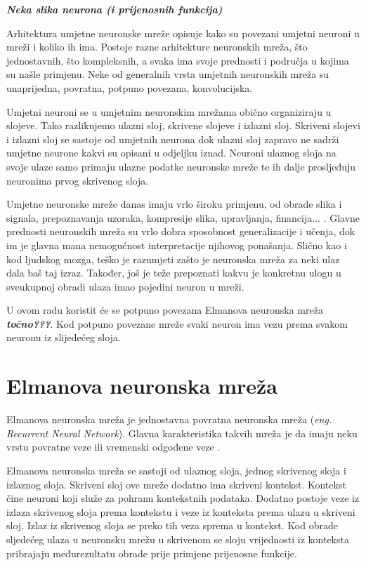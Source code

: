 \documentclass[zavrsnirad]{fer}
\begin{document}
	\textit{\textbf{Neka slika neurona (i prijenosnih funkcija)}}
	
	Arhitektura umjetne neuronske mreže opisuje kako su povezani umjetni neuroni u mreži i koliko ih ima. Postoje razne arhitekture neuronskih mreža, što jednostavnih, što kompleksnih, a svaka ima svoje prednosti i područja u kojima su našle primjenu. Neke od generalnih vrsta umjetnih neuronskih mreža su unaprijedna, povratna, potpuno povezana, konvolucijska.
	
	Umjetni neuroni se u umjetnim neuronskim mrežama obično organiziraju u slojeve. Tako razlikujemo ulazni sloj, skrivene slojeve i izlazni sloj. Skriveni slojevi i izlazni sloj se sastoje od umjetnih neurona dok ulazni sloj zapravo ne sadrži umjetne neurone kakvi su opisani u odjeljku iznad. Neuroni ulaznog sloja na svoje ulaze samo primaju ulazne podatke neuronske mreže te ih dalje prosljeđuju neuronima prvog skrivenog sloja.
	
	Umjetne neuronske mreže danas imaju vrlo široku primjenu, od obrade slika i signala, prepoznavanja uzoraka, kompresije slika, upravljanja, financija... \cite{skriptaNeuronskeMreze}. Glavne prednosti neuronskih mreža su vrlo dobra sposobnost generalizacije i učenja, dok im je glavna mana nemogućnost interpretacije njihovog ponašanja. Slično kao i kod ljudskog mozga, teško je razumjeti zašto je neuronska mreža za neki ulaz dala baš taj izraz. Također, još je teže prepoznati kakvu je konkretnu ulogu u sveukupnoj obradi ulaza imao pojedini neuron u mreži.
	
	U ovom radu koristit će se potpuno povezana Elmanova neuronska mreža \textit{\textbf{točno???}}. Kod potpuno povezane mreže svaki neuron ima vezu prema svakom neuronu iz slijedećeg sloja. 
	
	\section{Elmanova neuronska mreža}
	
		Elmanova neuronska mreža je jednostavna povratna neuronska mreža (\textit{eng. Recurrent Neural Network}). Glavna karakteristika takvih mreža je da imaju neku vrstu povratne veze ili vremenski odgođene veze \cite{ElmanNetSite}.
		
		Elmanova neuronska mreža se sastoji od ulaznog sloja, jednog skrivenog sloja i izlaznog sloja. Skriveni sloj ove mreže dodatno ima skriveni kontekst. Kontekst čine neuroni koji služe za pohranu kontekstnih podataka. Dodatno postoje veze iz izlaza skrivenog sloja prema kontekstu i veze iz konteksta prema ulazu u skriveni sloj. Izlaz iz skrivenog sloja se preko tih veza sprema u kontekst. Kod obrade sljedećeg ulaza u neuronsku mrežu u skrivenom se sloju vrijednosti iz konteksta pribrajaju međurezultatu obrade prije primjene prijenosne funkcije.
		
\end{document}
